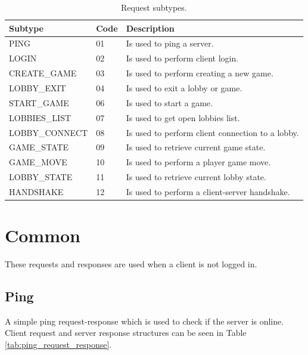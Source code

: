 \documentclass[english, sem, kiv, he, iso690alph, pdf, viewonly]{fasthesis}
\begin{document}
\begin{table}[h!]
	\centering
	\begin{tabular}{|l|l|l|}
		\hline
		\textbf{Subtype} & \textbf{Code} & \textbf{Description} \\ \hline
		PING & 01 & Is used to ping a server. \\ \hline
		LOGIN & 02 & Is used to perform client login. \\ \hline
		CREATE\_GAME & 03 & Is used to perform creating a new game. \\ \hline
		LOBBY\_EXIT & 04 & Is used to exit a lobby or game. \\ \hline
		START\_GAME & 06 & Is used to start a game. \\ \hline
		LOBBIES\_LIST & 07 & Is used to get open lobbies list. \\ \hline
		LOBBY\_CONNECT & 08 & Is used to perform client connection to a lobby. \\ \hline
		GAME\_STATE & 09 & Is used to retrieve current game state. \\ \hline
		GAME\_MOVE & 10 & Is used to perform a player game move. \\ \hline
		LOBBY\_STATE & 11 & Is used to retrieve current lobby state. \\ \hline
		HANDSHAKE & 12 & Is used to perform a client-server handshake. \\ \hline
	\end{tabular}
	\caption{Request subtypes.}
	\label{tab:request_subtypes}
\end{table}


\section{Common}
These requests and responses are used when a client is not logged in.

\subsection{Ping}
A simple ping request-response which is used to check if the server is online. Client request and server response structures can be seen in Table \ref{tab:ping_request_response}.
\end{document}
